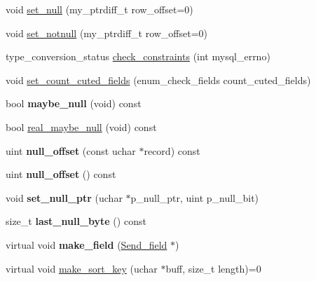 \begin{DoxyCompactItemize}
void \mbox{\hyperlink{classField_acb9fc7a058facc0374fab4fb0391855c}{set\+\_\+null}} (my\+\_\+ptrdiff\+\_\+t row\+\_\+offset=0)
\item 
void \mbox{\hyperlink{classField_a87f79bf10641a6f90b4a960f53bdcccd}{set\+\_\+notnull}} (my\+\_\+ptrdiff\+\_\+t row\+\_\+offset=0)
\item 
type\+\_\+conversion\+\_\+status \mbox{\hyperlink{classField_a77929bc38a68304c577d7cb3f2cba3a0}{check\+\_\+constraints}} (int mysql\+\_\+errno)
\item 
void \mbox{\hyperlink{classField_a1b865985a8c5b3d6f2c087d4869471a5}{set\+\_\+count\+\_\+cuted\+\_\+fields}} (enum\+\_\+check\+\_\+fields count\+\_\+cuted\+\_\+fields)
\item 
\mbox{\label{classField_a42927e3978c937053efdd45207ed1170}} 
bool {\bfseries maybe\+\_\+null} (void) const
\item 
bool \mbox{\hyperlink{classField_a9b78f4fab3123edfb5117f7937a116ed}{real\+\_\+maybe\+\_\+null}} (void) const
\item 
\mbox{\label{classField_aa36420070cf4d9b2c58534e5c2a569e2}} 
uint {\bfseries null\+\_\+offset} (const uchar $\ast$record) const
\item 
\mbox{\label{classField_a17a90cbedcea3eb7d32ae6d746d69a82}} 
uint {\bfseries null\+\_\+offset} () const
\item 
\mbox{\label{classField_a2a4c528f7133665d04947890adfc3c07}} 
void {\bfseries set\+\_\+null\+\_\+ptr} (uchar $\ast$p\+\_\+null\+\_\+ptr, uint p\+\_\+null\+\_\+bit)
\item 
\mbox{\label{classField_aaf4ff826dcc89e338a7d7b844b88c733}} 
size\+\_\+t {\bfseries last\+\_\+null\+\_\+byte} () const
\item 
\mbox{\label{classField_acbaed029456c06c8b7e3ae21fe820ef5}} 
virtual void {\bfseries make\+\_\+field} (\mbox{\hyperlink{classSend__field}{Send\+\_\+field}} $\ast$)
\item 
virtual void \mbox{\hyperlink{classField_af3bc27d237b6ae6ef3dc7a2aec3d79ac}{make\+\_\+sort\+\_\+key}} (uchar $\ast$buff, size\+\_\+t length)=0
\item 
\mbox{\label{classField_a47862ba56ea9e5734ee8b7c0819b560e}} 

\end{DoxyCompactItemize}
